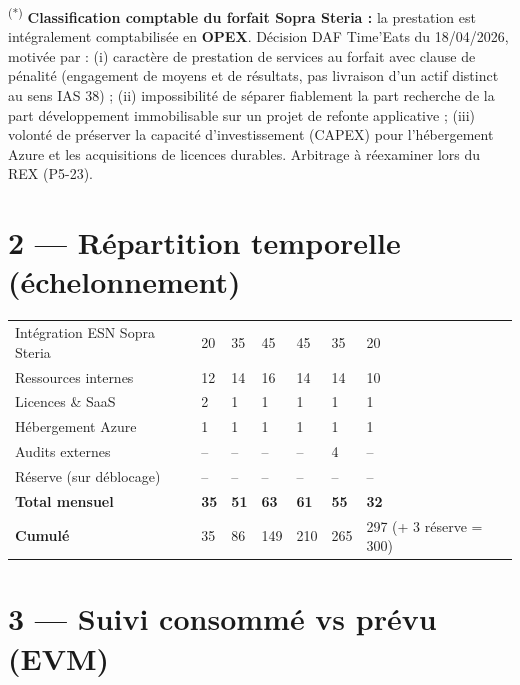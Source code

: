 \documentclass[11pt,a4paper,oneside]{report}
\begin{document}
\vspace{4pt}
{\footnotesize
\textsuperscript{(*)} \textbf{Classification comptable du forfait Sopra Steria :} la prestation est intégralement comptabilisée en \textbf{OPEX}. Décision DAF Time'Eats du 18/04/2026, motivée par : (i) caractère de prestation de services au forfait avec clause de pénalité (engagement de moyens et de résultats, pas livraison d'un actif distinct au sens IAS 38) ; (ii) impossibilité de séparer fiablement la part recherche de la part développement immobilisable sur un projet de refonte applicative ; (iii) volonté de préserver la capacité d'investissement (CAPEX) pour l'hébergement Azure et les acquisitions de licences durables. Arbitrage à réexaminer lors du REX (P5-23).
}

\section*{2 --- Répartition temporelle (échelonnement)}

\renewcommand{\arraystretch}{1.3}
\begin{tabularx}{\textwidth}{L{4.5cm} C{1.5cm} C{1.5cm} C{1.5cm} C{1.5cm} C{1.5cm} C{1.5cm}}
\toprule
{} &  &  &  &  &  &  \\
\midrule
Intégration ESN Sopra Steria & 20  & 35  & 45  & 45  & 35  & 20  \\
Ressources internes          & 12  & 14  & 16  & 14  & 14  & 10  \\
Licences \& SaaS             & 2   & 1   & 1   & 1   & 1   & 1   \\
Hébergement Azure            & 1   & 1   & 1   & 1   & 1   & 1   \\
Audits externes              & --  & --  & --  & --  & 4   & --  \\
Réserve (sur déblocage)      & --  & --  & --  & --  & --  & --  \\
\midrule
{}\textbf{Total mensuel} & \textbf{35} & \textbf{51} & \textbf{63} & \textbf{61} & \textbf{55} & \textbf{32} \\
\textbf{Cumulé}        & 35  & 86  & 149 & 210 & 265 & 297 (+ 3 réserve = 300) \\
\bottomrule
\end{tabularx}

\section*{3 --- Suivi consommé vs prévu (EVM)}
\end{document}
